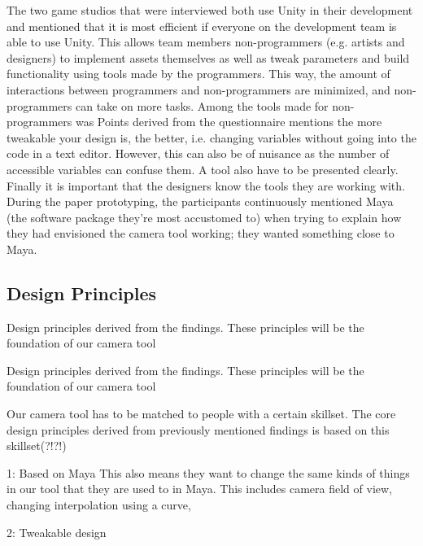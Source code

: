 	The two game studios that were interviewed both use Unity in their development and mentioned that it is most efficient if everyone on the development team is able to use Unity. This allows team members non-programmers (e.g. artists and designers) to implement assets themselves as well as tweak parameters and build functionality using tools made by the programmers. This way, the amount of interactions between programmers and non-programmers are minimized, and non-programmers can take on more tasks.
Among the tools made for non-programmers was 
Points derived from the questionnaire mentions the more tweakable  your design is, the better, i.e. changing variables without going into the code in a text editor. However, this can also be of nuisance as the number of accessible variables can confuse them. A tool also have to be presented clearly. Finally it is important that the designers know the tools they are working with.
During the paper prototyping, the participants continuously mentioned Maya (the software package they're most accustomed to) when trying to explain how they had envisioned the camera tool working; they wanted something close to Maya.

\subsection{Design Principles}
Design principles derived from the findings. These principles will be the foundation of our camera tool

Design principles derived from the findings. These principles will be the foundation of our camera tool

Our camera tool has to be matched to people with a certain skillset. The core design principles derived from previously mentioned findings is based on this skillset(?!?!)

1: Based on Maya
This also means they want to change the same kinds of things in our tool that they are used to in Maya. This includes camera field of view, changing interpolation using a curve,

2: Tweakable design
